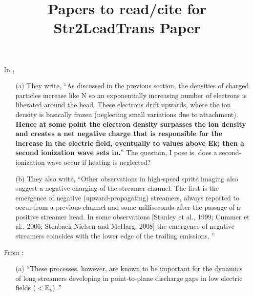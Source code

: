 \documentclass[]{article}
\title{Papers to read/cite for Str2LeadTrans Paper}
\author{}
\begin{document}
\maketitle



\section{}

\indent	In \textbf{\citep{Luque:2010}}, 
	
	\begin{itemize}
		\item[(a)] They write, ``As discussed in the previous section, the densities of charged particles increase like N so an exponentially increasing number of electrons is liberated around the head. These electrons drift upwards, where the ion density is basically frozen (neglecting small variations due to attachment). \textbf{Hence at some point the electron density surpasses the ion density and creates a net negative charge that is responsible for the increase in the electric field, eventually to values above Ek; then a second ionization wave sets in.}'' The question, I pose is, does a second-ionization wave occur if heating is neglected?
		
		\item[(b)] They also write, ``Other observations in high‐speed sprite imaging also suggest a negative charging of the streamer channel. The first is the emergence of negative (upward‐propagating) streamers, always reported to occur from a previous channel and some milliseconds after the passage of a positive streamer head. In some observations [Stanley et al., 1999; Cummer et al., 2006; Stenbaek‐Nielsen and McHarg, 2008] the emergence of negative streamers coincides with the lower edge of the trailing emissions. ''
	\end{itemize}

	


\noindent	From \textbf{\cite{Liu:2004a}}: 
	
	\begin{itemize}
		\item[(a)] ``These processes, however, are known to be important for the dynamics of long streamers developing in point-to-plane discharge gaps in low electric fields ($<$E$_k$) \cite{Morrow:1997b}.''
	\end{itemize}
\end{document}
